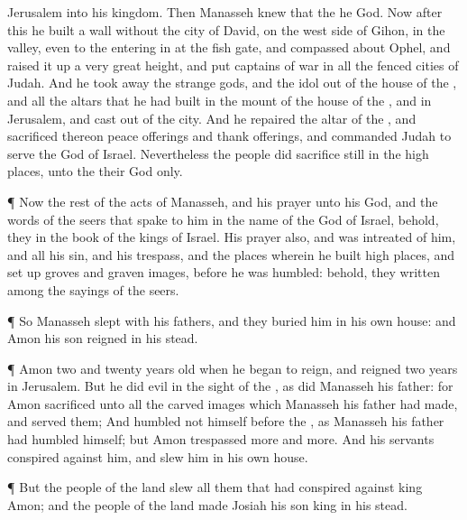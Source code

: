 {Jerusalem into his
kingdom. Then
Manasseh
knew that the
{} he
{}
God.
Now after
this he
built a
wall
without the
city of
David, on the west
side of
Gihon, in the
valley, even to the entering
in at the
fish
gate, and
compassed about
Ophel, and raised it
up a very great
height, and
put
captains of
war in all the
fenced
cities of
Judah.
And he took
away the
strange
gods, and the
idol out of the
house of the
{}, and all the
altars that he had
built in the
mount of the
house of the
{}, and in
Jerusalem, and
cast
{}
out of the
city.
And he
repaired the
altar of the
{}, and
sacrificed thereon
peace
offerings and thank
offerings, and
commanded
Judah to
serve the
{}
God of
Israel.
Nevertheless the
people did
sacrifice still in the high
places,
{} unto the
{} their
God only.
\par }{\PP {}¶ Now the
rest of the
acts of
Manasseh, and his
prayer unto his
God, and the
words of the
seers that
spake to him in the
name of the
{}
God of
Israel, behold, they
{} in the
book of the
kings of
Israel.
His
prayer also, and
{} was
intreated of him, and all his
sin, and his
trespass, and the
places wherein he
built high
places, and set
up
groves and graven
images,
before he was
humbled: behold, they
{}
written among the
sayings of the
seers.
\par }{\PP {}¶ So
Manasseh
slept with his
fathers, and they
buried him in his own
house: and
Amon his
son
reigned in his stead.
\par }{\PP {}¶
Amon
{}
two and
twenty
years
old when he began to
reign, and
reigned
two
years in
Jerusalem.
But he
did
{}
evil in the
sight of the
{}, as
did
Manasseh his
father: for
Amon
sacrificed unto all the carved
images which
Manasseh his
father had
made, and
served them;
And
humbled not himself
before the
{}, as
Manasseh his
father had
humbled himself; but
Amon
trespassed more and
more.
And his
servants
conspired against him, and
slew him in his own
house.
\par }{\PP {}¶ But the
people of the
land
slew all them that had
conspired against
king
Amon; and the
people of the
land
made
Josiah his
son
king in his stead.

}
